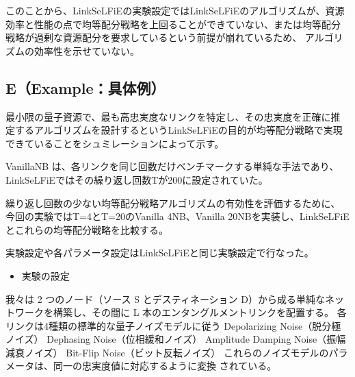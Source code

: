 \documentclass[twocolumn,a4paper,dvipdfmx]{ieicejsp}
\begin{document}
このことから、LinkSeLFiEの実験設定ではLinkSeLFiEのアルゴリズムが、資源
効率と性能の点で均等配分戦略を上回ることができていない、または均等配分
戦略が過剰な資源配分を要求しているという前提が崩れているため、
アルゴリズムの効率性を示せていない。
\subsection{E（Example：具体例）}
\label{sec:org7340178}
最小限の量子資源で、最も高忠実度なリンクを特定し、その忠実度を正確に推
定するアルゴリズムを設計するというLinkSeLFiEの目的が均等配分戦略で実現
できていることをシュミレーションによって示す。

VanillaNB は、各リンクを同じ回数だけベンチマークする単純な手法であり、
LinkSeLFiEではその繰り返し回数Tが200に設定されていた。

繰り返し回数の少ない均等配分戦略アルゴリズムの有効性を評価するために、
今回の実験ではT=4とT=20のVanilla 4NB、Vanilla 20NBを実装し、LinkSeLFiE
とこれらの均等配分戦略を比較する。

実験設定や各パラメータ設定はLinkSeLFiEと同じ実験設定で行なった。

\begin{itemize}
\item 実験の設定
\end{itemize}
我々は 2 つのノード（ソース S とデスティネーション D）から成る単純なネッ
トワークを構築し、その間に L 本のエンタングルメントリンクを配置する。
各リンクは4種類の標準的な量子ノイズモデルに従う
Depolarizing Noise（脱分極ノイズ）
Dephasing Noise（位相緩和ノイズ）
Amplitude Damping Noise（振幅減衰ノイズ）
Bit-Flip Noise（ビット反転ノイズ）
これらのノイズモデルのパラメータは、同一の忠実度値に対応するように変換
されている。
\end{document}
